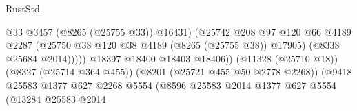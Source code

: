 \begin{lexlean}{RustStd}
\begin{coremodule}
                                                            @33
                                                            @3457
                                                            (@8265 (@25755 @33))
                                                            @16431)
                                                          (@25742
                                                            @208
                                                            @97
                                                            @120
                                                            @66
                                                            @4189
                                                            @2287
                                                            (@25750
                                                              @38
                                                              @120
                                                              @38
                                                              @4189
                                                              (@8265 (@25755 @38))
                                                              @17905)
                                                            (@8338 @25684 @2014)))))
                                                    @18397
                                                    @18400
                                                    @18403
                                                    @18406))
                                                (@11328 (@25710 @18))
                                                (@8327 (@25714 @364 @455))
                                                (@8201 (@25721 @455 @50 @2778 @2268))
                                                (@9418
                                                  @25583
                                                  @1377
                                                  @627
                                                  @2268
                                                  @5554
                                                  (@8596
                                                    @25583
                                                    @2014
                                                    @1377
                                                    @627
                                                    @5554
                                                    (@13284
                                                      @25583
                                                      @2014

\end{coremodule}
\end{lexlean}
